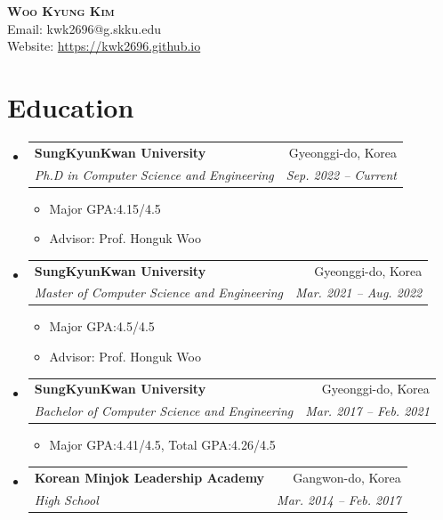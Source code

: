 \documentclass[letterpaper,11pt]{article}
\makeatletter
\newcommand{\resumeItem}[1]{
  \item\small{
    {#1 \vspace{-2pt}}
  }
}
\newcommand{\resumeSubheading}[4]{
  \vspace{-2pt}\item
    \begin{tabular*}{0.97\textwidth}[t]{l@{\extracolsep{\fill}}r}
      \textbf{#1} & #2 \\
      \textit{\small#3} & \textit{\small #4} \\
    \end{tabular*}\vspace{-7pt}
}
\newcommand{\resumeSubHeadingListStart}{\begin{itemize}[leftmargin=0.15in, label={}]}
\newcommand{\resumeSubHeadingListEnd}{\end{itemize}}
\newcommand{\resumeItemListStart}{\begin{itemize}}
\newcommand{\resumeItemListEnd}{\end{itemize}\vspace{-5pt}}
\makeatother
\begin{document}
\begin{center}
    \textbf{\Huge \scshape Woo Kyung Kim} \\
    \vspace{2mm}
    {Email: kwk2696@g.skku.edu} \\
    {Website: \href{https://kwk2696.github.io}{https://kwk2696.github.io}}
\end{center}


\section{Education}
  \resumeSubHeadingListStart
      \resumeSubheading
      {SungKyunKwan University}{Gyeonggi-do, Korea}
      {Ph.D in Computer Science and Engineering}{Sep. 2022 -- Current}
      \resumeItemListStart
        \resumeItem{Major GPA:4.15/4.5}
        \resumeItem{Advisor: Prof. Honguk Woo}
      \resumeItemListEnd

      \resumeSubheading
      {SungKyunKwan University}{Gyeonggi-do, Korea}
      {Master of Computer Science and Engineering}{Mar. 2021 -- Aug. 2022}
      \resumeItemListStart
        \resumeItem{Major GPA:4.5/4.5}
        \resumeItem{Advisor: Prof. Honguk Woo}
      \resumeItemListEnd

      \resumeSubheading
      {SungKyunKwan University}{Gyeonggi-do, Korea}
      {Bachelor of Computer Science and Engineering}{Mar. 2017 -- Feb. 2021}
      \resumeItemListStart
        \resumeItem{Major GPA:4.41/4.5, Total  GPA:4.26/4.5}
      \resumeItemListEnd

    \resumeSubheading
      {Korean Minjok Leadership Academy}{Gangwon-do, Korea}
      {High School}{Mar. 2014 -- Feb. 2017}
    \resumeSubHeadingListEnd

\end{document}
